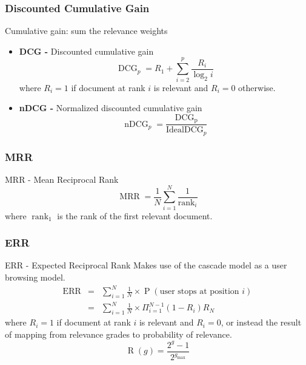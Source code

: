 \documentclass[svgnames]{beamer}
\begin{document}
\begin{frame}
  \frametitle{Discounted Cumulative Gain}
  
  \begin{block}{Cumulative gain: sum the relevance weights}
    \begin{itemize}
    \item \textbf{DCG -} Discounted cumulative gain
        \begin{displaymath}
            \operatorname{DCG}_p = R_1 + \sum_{i=2}^p\frac{R_i}{\log_2i}
        \end{displaymath}
        where $R_i = 1$ if document at rank $i$ is relevant and $R_i = 0$
        otherwise.
    \item \textbf{nDCG -} Normalized discounted cumulative gain
        \begin{displaymath}
            \operatorname{nDCG}_p = \frac{\operatorname{DCG_p}}{\text{Ideal}\operatorname{DCG}_p}
        \end{displaymath}
    \end{itemize}
  \end{block}
\end{frame}

\begin{frame}
  \frametitle{MRR}
  \begin{block}{MRR - Mean Reciprocal Rank}
        \begin{displaymath}
            \operatorname{MRR} = \frac{1}{N}\sum_{i=1}^N\frac{1}{\operatorname{rank}_i}
        \end{displaymath}
        where $\operatorname{rank}_1$ is the rank of the first relevant
        document.
  \end{block}
\end{frame}

\begin{frame} \frametitle{ERR}
\begin{block}{ERR - Expected Reciprocal Rank}
        Makes use of the cascade model as a user browsing model.
        \begin{eqnarray*}
            \operatorname{ERR} & = & \sum_{i=1}^N \frac{1}{N} \times {\operatorname{P}}(\text{user stops at position~} i) \\
                               & = & \sum_{i=1}^N \frac{1}{N} \times \Pi_{i=1}^{N-1}(1 - R_i) R_N
        \end{eqnarray*}
        where $R_i = 1$ if document at rank $i$ is relevant and $R_i = 0$, or instead the result of mapping from relevance grades to probability of relevance.
        \begin{displaymath}
        {\operatorname{R}}(g) = \frac{2^g - 1}{2^{g_{\max}}}
        \end{displaymath}
  \end{block}
\end{frame}
\end{document}
